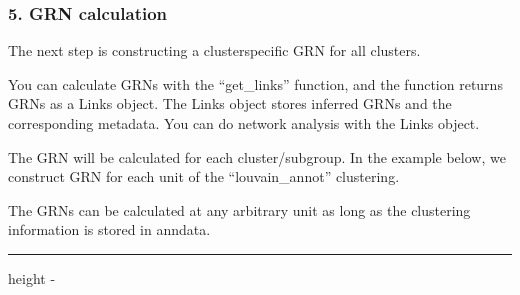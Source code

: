 \documentclass[letterpaper,10pt,english]{sphinxmanual}
\newlength\nbsphinxcodecellspacing
\begin{document}
{
\begin{sphinxVerbatim}[commandchars=\\\{\}]
\llap{\color{nbsphinxin}[19]:\,\hspace{\fboxrule}\hspace{\fboxsep}}
\end{sphinxVerbatim}
}


\subsubsection{5. GRN calculation}
\label{\detokenize{notebooks/04_Network_analysis/Network_analysis_with_Paul_etal_2015_data:5.-GRN-calculation}}
The next step is constructing a cluster\sphinxhyphen{}specific GRN for all clusters.

You can calculate GRNs with the “get\_links” function, and the function returns GRNs as a Links object. The Links object stores inferred GRNs and the corresponding metadata. You can do network analysis with the Links object.

The GRN will be calculated for each cluster/sub\sphinxhyphen{}group. In the example below, we construct GRN for each unit of the “louvain\_annot” clustering.

The GRNs can be calculated at any arbitrary unit as long as the clustering information is stored in anndata.

{
\begin{sphinxVerbatim}[commandchars=\\\{\}]
\llap{\color{nbsphinxin}[67]:\,\hspace{\fboxrule}\hspace{\fboxsep}}
 
\end{sphinxVerbatim}
}

\hrule height -\fboxrule\relax
\vspace{\nbsphinxcodecellspacing}
\end{document}
